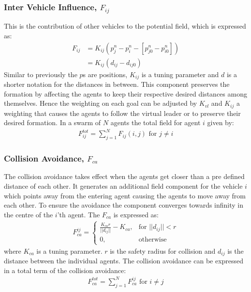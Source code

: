 \subsubsection{Inter Vehicle Influence, $F_{ij}$}
This is the contribution of other vehicles to the potential field,
which is expressed as:
\begin{align}
F_{ij} &= K_{ij}(p_{j}^n-p_i^n-[p_{j0}^n-p_{i0}^n])\\
&= K_{ij}(d_{ij}-d_{ij0})
\end{align}
Similar to previously the $p$s are positions, $K_{ij}$ is a tuning
parameter and $d$ is a shorter notation for the distances in between.
This component preserves the formation by affecting the agents to keep
their respective desired distances among themselves. Hence the
weighting on each goal can be adjusted by $K_{vl}$ and $K_{ij}$ a
weighting that causes the agents to follow the virtual leader or to
preserve their desired formation.  In a swarm of $N$ agents the total
field for agent $i$ given by:
\begin{align}
F_{ij}^{tot} = \sum\limits_{j=1}^NF_{ij}(i,j) \text{ for } j\neq i
\end{align}

\subsubsection{Collision Avoidance, $F_{ca}$}
The collision avoidance takes effect when the agents get closer than a
pre defined distance of each other. It generates an additional field
component for the vehicle $i$ which points away from the entering
agent causing the agents to move away from each other. To ensure the
avoidance the component converges towards infinity in the centre of
the $i$'th agent. The $F_{ca}$ is expressed as:
\begin{align}
    F_{ca}^{ij}= 
\begin{cases}
    \frac{K_{ca}r}{||d_{ij}||}-K_{ca},& \text{for } ||d_{ij}||<r\\
    0,              & \text{otherwise}
\end{cases}
\end{align}
where $K_{ca}$ is a tuning parameter. $r$ is the safety radius for
collision and $d_{ij}$ is the distance between the individual agents.
The collision avoidance can be expressed in a total term of the
collision avoidance:
\begin{align}
F_{ca}^{tot} = \sum\limits_{j=1}^NF_{ca}^{ij} \text{ for } i\neq j
\end{align}

